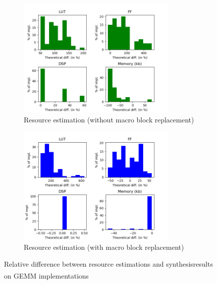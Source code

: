             \begin{figure}[h!]
            \centering
            \begin{subfigure}{1.0\textwidth}
                \centering
                \includegraphics[width=0.85\textwidth]{Figures/results/gemmRelativeWithoutMacro}
                \caption{Resource estimation (without macro block replacement)}
                \label{ch.expe:sec.strategies:ssec.resource:fig.gemm:sfig.without}
            \end{subfigure}
            \begin{subfigure}{1.0\textwidth}
                \centering
                \includegraphics[width=0.85\textwidth]{Figures/results/gemmRelativeWithMacro}
                \caption{Resource estimation (with macro block replacement)}
                \label{ch.expe:sec.strategies:ssec.resource:fig.gemm:sfig.with}
            \end{subfigure}
            \caption[Quality of resource estimations on GEMM]{Relative difference between resource estimations and synthesis\newline results on GEMM implementations\textsuperscript{\styx}}
            \label{ch.expe:sec.strategies:ssec.resource:fig.gemm}
        \end{figure}

